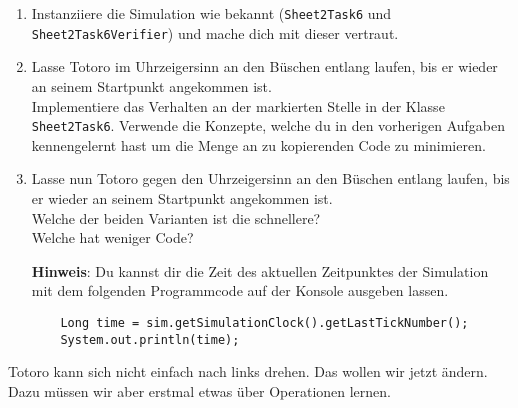 

\begin{enumerate}
    \item Instanziiere die Simulation wie bekannt (\lstinline{Sheet2Task6} und \lstinline{Sheet2Task6Verifier}) und mache dich mit dieser vertraut.
    \item Lasse Totoro im Uhrzeigersinn an den Büschen entlang laufen, bis er wieder an seinem Startpunkt angekommen ist.\\
    Implementiere das Verhalten an der markierten Stelle in der Klasse \lstinline{Sheet2Task6}. Verwende die Konzepte, welche du in den vorherigen Aufgaben kennengelernt hast um die Menge an zu kopierenden Code zu minimieren.
    \item Lasse nun Totoro gegen den Uhrzeigersinn an den Büschen entlang laufen, bis er wieder an seinem Startpunkt angekommen ist.\\
    Welche der beiden Varianten ist die schnellere?\\
    Welche hat weniger Code?
    
    \textbf{Hinweis}: Du kannst dir die Zeit des aktuellen Zeitpunktes der Simulation mit dem folgenden Programmcode auf der Konsole ausgeben lassen.

        \begin{lstlisting}
    Long time = sim.getSimulationClock().getLastTickNumber();
    System.out.println(time);
        \end{lstlisting}

        
\end{enumerate}

        Totoro kann sich nicht einfach nach links drehen.
        Das wollen wir jetzt ändern.
        Dazu müssen wir aber erstmal etwas über Operationen lernen.

